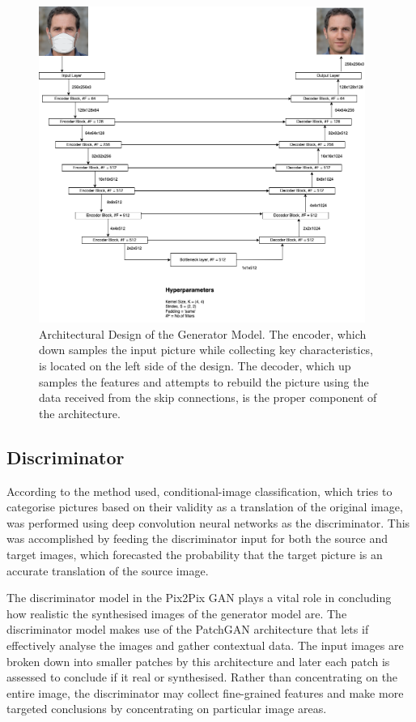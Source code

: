 \documentclass{./styles/svproc}
\begin{document}
\begin{figure}[ht]%
\centering
\includegraphics[width=0.95\textwidth]{figures/generator.png}
\caption{Architectural Design of the Generator Model. The encoder, which down samples the input picture while collecting key characteristics, is located on the left side of the design. The decoder, which up samples the features and attempts to rebuild the picture using the data received from the skip connections, is the proper component of the architecture.}\label{fig2}
\end{figure}

\subsection{Discriminator}\label{subsec4}

According to the method used, conditional-image classification, which tries to categorise pictures based on their validity as a translation of the original image, was performed using deep convolution neural networks as the discriminator. This was accomplished by feeding the discriminator input for both the source and target images, which forecasted the probability that the target picture is an accurate translation of the source image.

The discriminator model in the Pix2Pix GAN plays a vital role in concluding how realistic the synthesised images of the generator model are. The discriminator model makes use of the PatchGAN architecture that lets if effectively analyse the images and gather contextual data. The input images are broken down into smaller patches by this architecture and later each patch is assessed to conclude if it real or synthesised. Rather than concentrating on the entire image, the discriminator may collect fine-grained features and make more targeted conclusions by concentrating on particular image areas.
\end{document}
